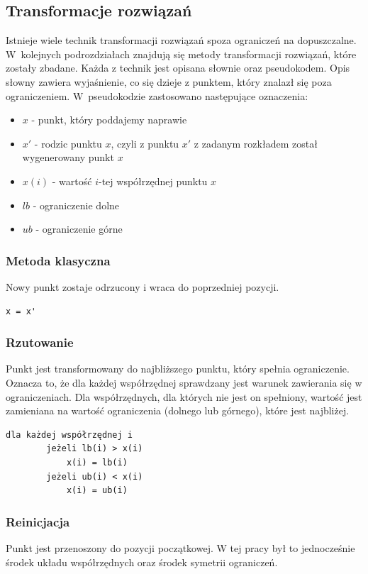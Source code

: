 \documentclass{mini}
\begin{document}
\subsection{Transformacje rozwiązań} \label{transformacje}
Istnieje wiele technik transformacji rozwiązań spoza ograniczeń na dopuszczalne. W~kolejnych podrozdziałach znajdują się metody transformacji rozwiązań, które zostały zbadane. Każda z technik jest opisana słownie oraz pseudokodem. Opis słowny zawiera wyjaśnienie, co się dzieje z punktem, który znalazł się poza ograniczeniem. W~pseudokodzie zastosowano następujące oznaczenia:
\begin{itemize}[noitemsep]
\item $x$ - punkt, który poddajemy naprawie
\item $x'$ - rodzic punktu $x$, czyli z punktu $x'$ z zadanym rozkładem został wygenerowany punkt $x$
\item $x(i)$ - wartość $i$-tej współrzędnej punktu $x$
\item $lb$ - ograniczenie dolne
\item $ub$ - ograniczenie górne
\end{itemize}

\subsubsection{Metoda klasyczna}
Nowy punkt zostaje odrzucony i wraca do poprzedniej pozycji.

\begin{Verbatim}[baselinestretch=1.1]
	x = x'
\end{Verbatim}


\subsubsection{Rzutowanie}
Punkt jest transformowany do najbliższego punktu, który spełnia ograniczenie. Oznacza to, że dla każdej współrzędnej sprawdzany jest warunek zawierania się w ograniczeniach. Dla współrzędnych, dla których nie jest on spełniony, wartość jest zamieniana na wartość ograniczenia (dolnego lub górnego), które jest najbliżej.

\begin{Verbatim}[baselinestretch=1.1]
	dla każdej współrzędnej i
		jeżeli lb(i) > x(i)
			x(i) = lb(i)
		jeżeli ub(i) < x(i)
			x(i) = ub(i)
\end{Verbatim}

\subsubsection{Reinicjacja}
Punkt jest przenoszony do pozycji początkowej. W tej pracy był to jednocześnie środek układu współrzędnych oraz środek symetrii ograniczeń.
\end{document}
